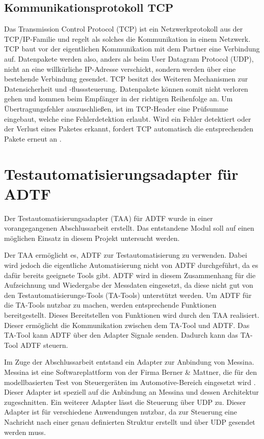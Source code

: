 \documentclass[12pt,a4paper]{report}
\begin{document}
\subsection{Kommunikationsprotokoll TCP}\label{subsec:Kommunikationsprotokoll TCP}
Das Transmission Control Protocol (TCP) ist ein Netzwerkprotokoll aus der TCP/IP-Familie und regelt als solches die Kommunikation in einem Netzwerk. TCP baut vor der eigentlichen Kommunikation mit dem Partner eine Verbindung auf. Datenpakete werden also, anders als beim User Datagram Protocol (UDP), nicht an eine willkürliche IP-Adresse verschickt, sondern werden über eine bestehende Verbindung gesendet. TCP besitzt des Weiteren Mechanismen zur Datensicherheit und -flusssteuerung. Datenpakete können somit nicht verloren gehen und kommen beim Empfänger in der richtigen Reihenfolge an. Um Übertragungsfehler auszuschlie\ss en, ist im TCP-Header eine Prüfsumme eingebaut, welche eine Fehlerdetektion erlaubt. Wird ein Fehler detektiert oder der Verlust eines Paketes erkannt, fordert TCP automatisch die entsprechenden Pakete erneut an \cite{ElkoTCP}.
\section{Testautomatisierungsadapter für ADTF}\label{sec:Testautomatisierungsadapter}
Der Testautomatisierungsadapter (TAA) für ADTF wurde in einer vorangegangenen Abschlussarbeit \cite{MasterEckerlebe} erstellt. Das entstandene Modul soll auf einen möglichen Einsatz in diesem Projekt untersucht werden.

Der TAA ermöglicht es, ADTF zur Testautomatisierung zu verwenden. Dabei wird jedoch die eigentliche Automatisierung nicht von ADTF durchgeführt, da es dafür bereits geeignete Tools gibt. ADTF wird in diesem Zusammenhang für die Aufzeichnung und Wiedergabe der Messdaten eingesetzt, da diese nicht gut von den Testautomatisierungs-Tools (TA-Tools) unterstützt werden. Um ADTF für die TA-Tools nutzbar zu machen, werden entsprechende Funktionen bereitgestellt. Dieses Bereitstellen von Funktionen wird durch den TAA realisiert. Dieser ermöglicht die Kommunikation zwischen dem TA-Tool und ADTF. Das TA-Tool kann ADTF über den Adapter Signale senden. Dadurch kann das TA-Tool ADTF steuern.

Im Zuge der Abschlussarbeit entstand ein Adapter zur Anbindung von Messina. Messina ist eine Softwareplattform von der Firma Berner \& Mattner, die für den modellbasierten Test von Steuergeräten im Automotive-Bereich eingesetzt wird \cite{BernerMattnerMessina}. Dieser Adapter ist speziell auf die Anbindung an Messina und dessen Architektur zugeschnitten. Ein weiterer Adapter lässt die Steuerung über UDP zu. Dieser Adapter ist für verschiedene Anwendungen nutzbar, da zur Steuerung eine Nachricht nach einer genau definierten Struktur erstellt und über UDP gesendet werden muss.
\end{document}
